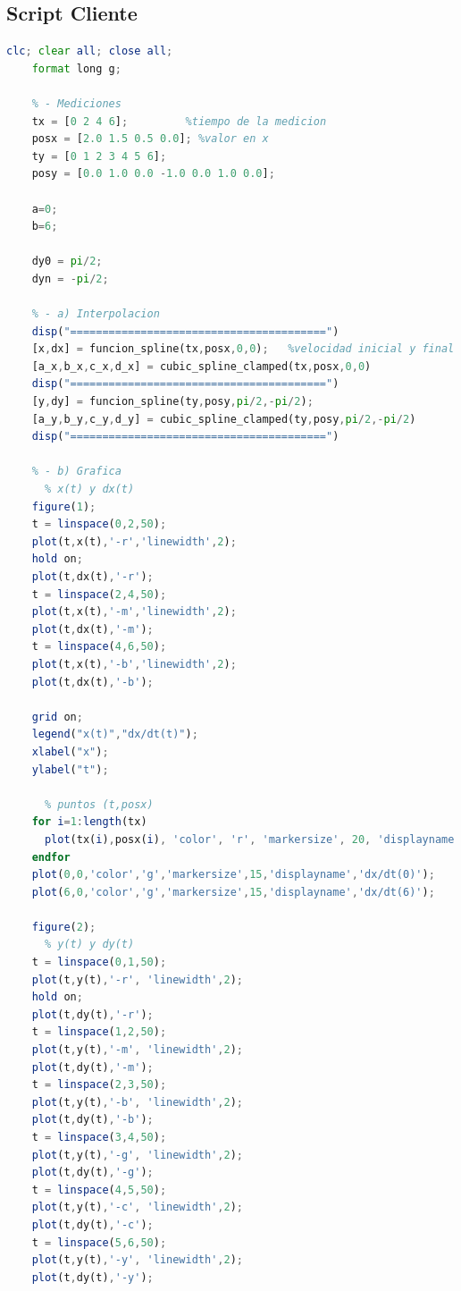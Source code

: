 \documentclass{article}
\begin{document}
    \subsection{Script Cliente}
    \begin{lstlisting}[language=Octave]
    clc; clear all; close all;
    format long g;
    
    % - Mediciones
    tx = [0 2 4 6];         %tiempo de la medicion
    posx = [2.0 1.5 0.5 0.0]; %valor en x
    ty = [0 1 2 3 4 5 6];
    posy = [0.0 1.0 0.0 -1.0 0.0 1.0 0.0];
    
    a=0;
    b=6;
    
    dy0 = pi/2;
    dyn = -pi/2;
    
    % - a) Interpolacion
    disp("========================================")
    [x,dx] = funcion_spline(tx,posx,0,0);   %velocidad inicial y final nulas en x
    [a_x,b_x,c_x,d_x] = cubic_spline_clamped(tx,posx,0,0)
    disp("========================================")
    [y,dy] = funcion_spline(ty,posy,pi/2,-pi/2);
    [a_y,b_y,c_y,d_y] = cubic_spline_clamped(ty,posy,pi/2,-pi/2)
    disp("========================================")
    
    % - b) Grafica
      % x(t) y dx(t)
    figure(1);
    t = linspace(0,2,50);
    plot(t,x(t),'-r','linewidth',2);
    hold on;
    plot(t,dx(t),'-r');
    t = linspace(2,4,50);
    plot(t,x(t),'-m','linewidth',2);
    plot(t,dx(t),'-m');
    t = linspace(4,6,50);
    plot(t,x(t),'-b','linewidth',2);
    plot(t,dx(t),'-b');
    
    grid on;
    legend("x(t)","dx/dt(t)");
    xlabel("x");
    ylabel("t");
    
      % puntos (t,posx)
    for i=1:length(tx)
      plot(tx(i),posx(i), 'color', 'r', 'markersize', 20, 'displayname', strcat("x(", num2str(tx(i)),")"));
    endfor
    plot(0,0,'color','g','markersize',15,'displayname','dx/dt(0)');
    plot(6,0,'color','g','markersize',15,'displayname','dx/dt(6)');
    
    figure(2);
      % y(t) y dy(t)
    t = linspace(0,1,50);
    plot(t,y(t),'-r', 'linewidth',2);
    hold on;
    plot(t,dy(t),'-r');
    t = linspace(1,2,50);
    plot(t,y(t),'-m', 'linewidth',2);
    plot(t,dy(t),'-m');
    t = linspace(2,3,50);
    plot(t,y(t),'-b', 'linewidth',2);
    plot(t,dy(t),'-b');
    t = linspace(3,4,50);
    plot(t,y(t),'-g', 'linewidth',2);
    plot(t,dy(t),'-g');
    t = linspace(4,5,50);
    plot(t,y(t),'-c', 'linewidth',2);
    plot(t,dy(t),'-c');
    t = linspace(5,6,50);
    plot(t,y(t),'-y', 'linewidth',2);
    plot(t,dy(t),'-y');
    

\end{lstlisting}
\end{document}
